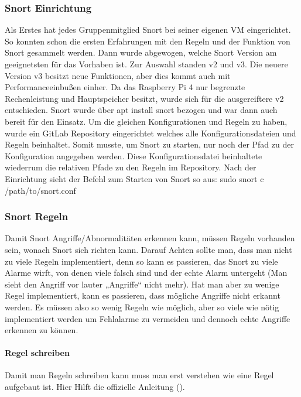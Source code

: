 \documentclass[letterpaper,10pt,ngerman]{sphinxmanual}
\begin{document}
\subsubsection{Snort Einrichtung}
\label{\detokenize{ids:snort-einrichtung}}
Als Erstes hat jedes Gruppenmitglied Snort bei seiner eigenen VM eingerichtet. So konnten schon die ersten Erfahrungen mit den Regeln und der Funktion von Snort gesammelt werden. Dann wurde abgewogen, welche Snort Version am geeignetsten für das Vorhaben ist. Zur Auswahl standen v2 und v3. Die neuere Version v3 besitzt neue Funktionen, aber dies kommt auch mit Performanceeinbußen einher. Da das Raspberry Pi 4 nur begrenzte Rechenleistung und Hauptspeicher besitzt, wurde sich für die ausgereiftere v2 entschieden. Snort wurde über apt install snort bezogen und war dann auch bereit für den Einsatz. Um die gleichen Konfigurationen und Regeln zu haben, wurde ein GitLab Repository eingerichtet welches alle Konfigurationsdateien und Regeln beinhaltet. Somit musste, um Snort zu starten, nur noch der Pfad zu der Konfiguration angegeben werden. Diese Konfigurationsdatei beinhaltete wiederrum die relativen Pfade zu den Regeln im Repository. Nach der Einrichtung sieht der Befehl zum Starten von Snort so aus: sudo snort \sphinxhyphen{}c /path/to/snort.conf


\subsubsection{Snort Regeln}
\label{\detokenize{ids:snort-regeln}}
Damit Snort Angriffe/Abnormalitäten erkennen kann, müssen Regeln vorhanden sein, wonach Snort sich richten kann. Darauf Achten sollte man, dass man nicht zu viele Regeln implementiert, denn so kann es passieren, das Snort zu viele Alarme wirft, von denen viele  falsch sind und der echte Alarm untergeht (Man sieht den Angriff vor lauter „Angriffe“ nicht mehr). Hat man aber zu wenige Regel implementiert, kann es passieren, dass mögliche Angriffe nicht erkannt werden. Es müssen also so wenig Regeln wie möglich, aber so viele wie nötig implementiert werden um Fehlalarme zu vermeiden und dennoch echte Angriffe erkennen zu können.


\paragraph{Regel schreiben}
\label{\detokenize{ids:regel-schreiben}}
Damit man Regeln schreiben kann muss man erst verstehen wie eine Regel
aufgebaut ist. Hier Hilft die offizielle Anleitung
().
\end{document}

